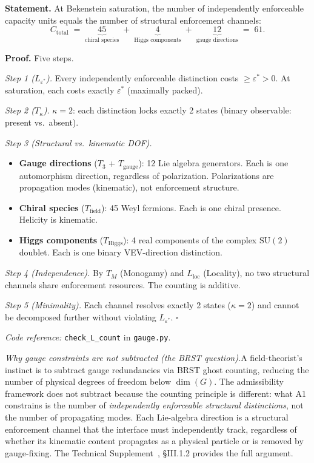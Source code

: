 \documentclass[11pt]{article}
\newenvironment{varlist}{\begin{itemize}[nosep,leftmargin=2em]}{\end{itemize}}
\newcommand{\coderef}[2]{\smallskip\noindent\textit{Code reference:} \texttt{#1} in \texttt{#2}.}
\newcommand{\SU}{\mathrm{SU}}
\begin{document}
\begin{tcolorbox}[apfbox, title={Lemma $L_{\mathrm{count}}$ (Capacity Counting)}]
\textbf{Statement.}  At Bekenstein saturation, the number of independently enforceable capacity units equals the number of structural enforcement channels:
\begin{equation}
C_{\mathrm{total}} \;=\; \underbrace{45}_{\text{chiral species}} \;+\; \underbrace{4}_{\text{Higgs components}} \;+\; \underbrace{12}_{\text{gauge directions}} \;=\; 61.
\label{eq:ctotal}
\end{equation}

\smallskip\noindent\textbf{Proof.}  Five steps.

\textit{Step 1 ($L_{\varepsilon^*}$).}  Every independently enforceable distinction costs $\ge \varepsilon^* > 0$.  At saturation, each costs exactly $\varepsilon^*$ (maximally packed).

\textit{Step 2 ($T_\kappa$).}  $\kappa = 2$: each distinction locks exactly 2 states (binary observable: present vs.\ absent).

\textit{Step 3 (Structural vs.\ kinematic DOF).}
\begin{varlist}
\item \textbf{Gauge directions} ($T_3$ + $T_{\mathrm{gauge}}$): 12 Lie algebra generators.  Each is one automorphism direction, regardless of polarization.  Polarizations are propagation modes (kinematic), not enforcement structure.
\item \textbf{Chiral species} ($T_{\mathrm{field}}$): 45 Weyl fermions.  Each is one chiral presence.  Helicity is kinematic.
\item \textbf{Higgs components} ($T_{\mathrm{Higgs}}$): 4 real components of the complex $\SU(2)$ doublet.  Each is one binary VEV-direction distinction.
\end{varlist}

\textit{Step 4 (Independence).}  By $T_M$ (Monogamy) and $L_{\mathrm{loc}}$ (Locality), no two structural channels share enforcement resources.  The counting is additive.

\textit{Step 5 (Minimality).}  Each channel resolves exactly 2 states ($\kappa = 2$) and cannot be decomposed further without violating $L_{\varepsilon^*}$.  $\square$

\coderef{check\_L\_count}{gauge.py}
\end{tcolorbox}

\smallskip\noindent\textit{Why gauge constraints are not subtracted (the BRST question).}\quad A field-theorist's instinct is to subtract gauge redundancies via BRST ghost counting, reducing the number of physical degrees of freedom below $\dim(G)$.  The admissibility framework does not subtract because the counting principle is different: what A1 constrains is the number of \emph{independently enforceable structural distinctions}, not the number of propagating modes.  Each Lie-algebra direction is a structural enforcement channel that the interface must independently track, regardless of whether its kinematic content propagates as a physical particle or is removed by gauge-fixing.  The Technical Supplement~\cite{BrookeP2Supplement}, \S III.1.2 provides the full argument.
\end{document}
